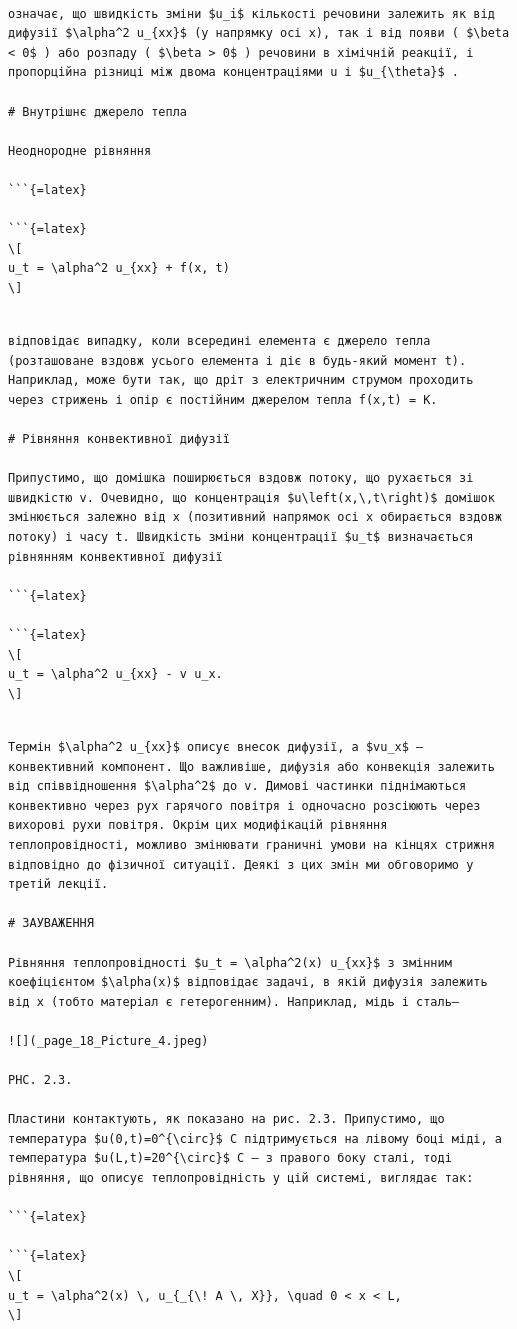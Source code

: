 \documentclass[
]{article}
\begin{document}
\begin{verbatim}

означає, що швидкість зміни $u_i$ кількості речовини залежить як від дифузії $\alpha^2 u_{xx}$ (у напрямку осі x), так і від появи ( $\beta < 0$ ) або розпаду ( $\beta > 0$ ) речовини в хімічній реакції, і пропорційна різниці між двома концентраціями u і $u_{\theta}$ .

# Внутрішнє джерело тепла

Неоднородне рівняння

```{=latex}

```{=latex}
\[
u_t = \alpha^2 u_{xx} + f(x, t)
\]
\end{verbatim}

\begin{verbatim}

відповідає випадку, коли всередині елемента є джерело тепла (розташоване вздовж усього елемента і діє в будь-який момент t). Наприклад, може бути так, що дріт з електричним струмом проходить через стрижень і опір є постійним джерелом тепла f(x,t) = K.

# Рівняння конвективної дифузії

Припустимо, що домішка поширюється вздовж потоку, що рухається зі швидкістю v. Очевидно, що концентрація $u\left(x,\,t\right)$ домішок змінюється залежно від x (позитивний напрямок осі x обирається вздовж потоку) і часу t. Швидкість зміни концентрації $u_t$ визначається рівнянням конвективної дифузії

```{=latex}

```{=latex}
\[
u_t = \alpha^2 u_{xx} - v u_x.
\]
\end{verbatim}

\begin{verbatim}

Термін $\alpha^2 u_{xx}$ описує внесок дифузії, а $vu_x$ — конвективний компонент. Що важливіше, дифузія або конвекція залежить від співвідношення $\alpha^2$ до v. Димові частинки піднімаються конвективно через рух гарячого повітря і одночасно розсіюють через вихорові рухи повітря. Окрім цих модифікацій рівняння теплопровідності, можливо змінювати граничні умови на кінцях стрижня відповідно до фізичної ситуації. Деякі з цих змін ми обговоримо у третій лекції.

# ЗАУВАЖЕННЯ

Рівняння теплопровідності $u_t = \alpha^2(x) u_{xx}$ з змінним коефіцієнтом $\alpha(x)$ відповідає задачі, в якій дифузія залежить від x (тобто матеріал є гетерогенним). Наприклад, мідь і сталь—

![](_page_18_Picture_4.jpeg)

PHC. 2.3.

Пластини контактують, як показано на рис. 2.3. Припустимо, що температура $u(0,t)=0^{\circ}$ C підтримується на лівому боці міді, а температура $u(L,t)=20^{\circ}$ C — з правого боку сталі, тоді рівняння, що описує теплопровідність у цій системі, виглядає так:

```{=latex}

```{=latex}
\[
u_t = \alpha^2(x) \, u_{_{\! A \, X}}, \quad 0 < x < L,
\]
\end{verbatim}
\end{document}
